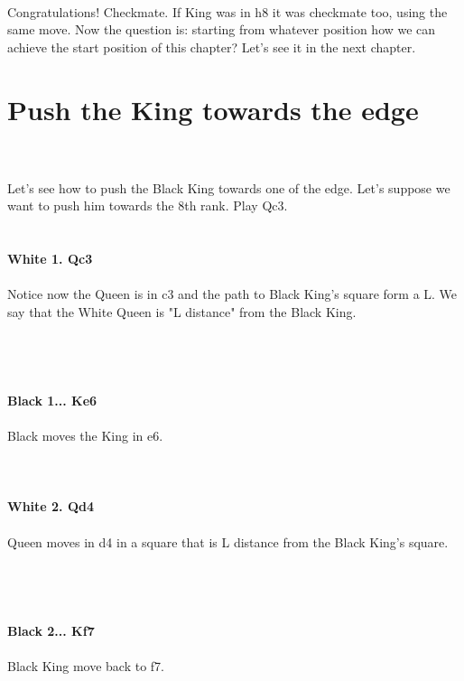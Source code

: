 \documentclass{article}
\begin{document}
\\
Congratulations! Checkmate. If King was in h8 it was checkmate too, using the same move. Now the question is: starting from whatever position how we can achieve the start position of this chapter? Let's see it in the next chapter.\section{ Push the King towards the edge}

\\
\\
Let's see how to push the Black King towards one of the edge. Let's suppose we want to push him towards the 8th rank. Play Qc3.\\

\\
\\
\textbf{White 1. Qc3}\\
\\
Notice now the Queen is in c3 and the path to Black King's square form a L. We say that the White Queen is "L distance" from the Black King.\\\\
\\

\\
\\
\textbf{Black 1... Ke6}\\
\\
Black moves the King in e6.\\
\\

\\
\\
\textbf{White 2. Qd4}\\
\\
Queen moves in d4 in a square that is L distance from the Black King's square.\\\\
\\

\\
\\
\textbf{Black 2... Kf7}\\
\\
Black King move back to f7.\\
\\

\end{document}
